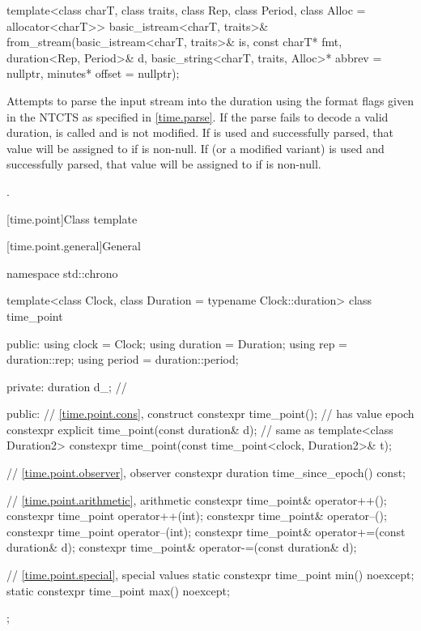 %
\begin{itemdecl}
template<class charT, class traits, class Rep, class Period, class Alloc = allocator<charT>>
  basic_istream<charT, traits>&
    from_stream(basic_istream<charT, traits>& is, const charT* fmt,
                duration<Rep, Period>& d,
                basic_string<charT, traits, Alloc>* abbrev = nullptr,
                minutes* offset = nullptr);
\end{itemdecl}

\begin{itemdescr}
\pnum
\effects
Attempts to parse the input stream 
into the duration 
using the format flags given in the NTCTS 
as specified in \ref{time.parse}.
If the parse fails to decode a valid duration,
 is called and  is not modified.
If  is used and successfully parsed,
that value will be assigned to  if  is non-null.
If  (or a modified variant) is used and successfully parsed,
that value will be assigned to  if  is non-null.

\pnum
\returns
{}.
\end{itemdescr}

[time.point]{Class template }

[time.point.general]{General}

%
\begin{codeblock}
namespace std::chrono {
  template<class Clock, class Duration = typename Clock::duration>
  class time_point {
  public:
    using clock    = Clock;
    using duration = Duration;
    using rep      = duration::rep;
    using period   = duration::period;

  private:
    duration d_;                                                // \expos

  public:
    // \ref{time.point.cons}, construct
    constexpr time_point();                                     // has value epoch
    constexpr explicit time_point(const duration& d);           // same as 
    template<class Duration2>
      constexpr time_point(const time_point<clock, Duration2>& t);

    // \ref{time.point.observer}, observer
    constexpr duration time_since_epoch() const;

    // \ref{time.point.arithmetic}, arithmetic
    constexpr time_point& operator++();
    constexpr time_point operator++(int);
    constexpr time_point& operator--();
    constexpr time_point operator--(int);
    constexpr time_point& operator+=(const duration& d);
    constexpr time_point& operator-=(const duration& d);

    // \ref{time.point.special}, special values
    static constexpr time_point min() noexcept;
    static constexpr time_point max() noexcept;
  };
}
\end{codeblock}


